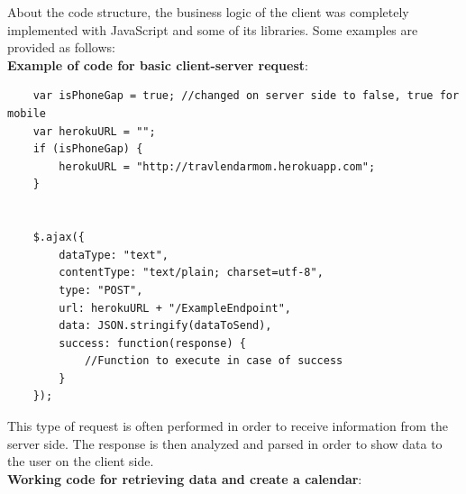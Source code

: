 \documentclass[numbers=noenddot, 12pt, a4paper, oneside]{scrbook}
\begin{document}
About the code structure, the business logic of the client was completely implemented with JavaScript and some of its libraries. Some examples are provided as follows:\\ 

\lstset{language=JavaScript}
\textbf{Example of code for basic client-server request}:

\begin{lstlisting}
	var isPhoneGap = true; //changed on server side to false, true for mobile
	var herokuURL = "";
	if (isPhoneGap) {
		herokuURL = "http://travlendarmom.herokuapp.com";
	}


	$.ajax({
		dataType: "text",
		contentType: "text/plain; charset=utf-8",
		type: "POST",
		url: herokuURL + "/ExampleEndpoint",
		data: JSON.stringify(dataToSend),
		success: function(response) {
			//Function to execute in case of success
		}
	});
\end{lstlisting}

This type of request is often performed in order to receive information from the server side. The response is then analyzed and parsed in order to show data to the user on the client side.\\

\textbf{Working code for retrieving data and create a calendar}:
\end{document}
